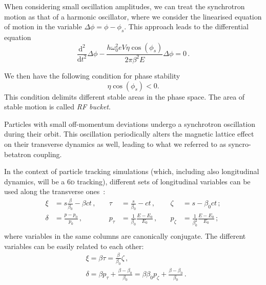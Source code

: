 When considering small oscillation amplitudes, we can treat the synchrotron motion as that of a harmonic oscillator, where we consider the linearised equation of motion in the variable $\Delta \phi=\phi-\phi_s$. This approach leads to the differential equation
\begin{equation}
    \frac{\mathrm{d}^2}{\mathrm{d} t^2} \Delta \phi-\frac{h \omega_0^2 e V \eta \cos \left(\phi_s\right)}{2 \pi \beta^2 E} \Delta \phi=0 \,.
\end{equation}

We then have the following condition for phase stability
\begin{equation}
    \eta \cos \left(\phi_s\right)<0 .
\end{equation}
This condition delimits different stable areas in the phase space. The area of stable motion is called \textit{RF bucket}. %

Particles with small off-momentum deviations undergo a synchrotron oscillation during their orbit. This oscillation periodically alters the magnetic lattice effect on their transverse dynamics as well, leading to what we referred to as syncro-betatron coupling.

In the context of particle tracking simulations (which, including also longitudinal dynamics, will be a 6\textsc{d} tracking), different sets of longitudinal variables can be used along the transverse ones~\cite{xsuite:physics}:
\begin{equation}
    \begin{aligned}
    \xi &= s \frac{\beta}{\beta_0}-\beta c t \,,\quad& \tau &= \frac{s}{\beta_0}-c t \,,\quad& \zeta &= s-\beta_0 c t \,;\\
    \delta &= \frac{p-p_0}{p_0} \,,\quad& p_\tau &= \frac{1}{\beta_0} \frac{E-E_0}{E_0} \,,\quad& p_\zeta &= \frac{1}{\beta_0^2} \frac{E-E_0}{E_0}\,; \\
    \end{aligned}
\end{equation}
where variables in the same columns are canonically conjugate.
The different variables can be easily related to each other:
\begin{equation}
    \begin{aligned}
    &\xi=\beta \tau=\frac{\beta}{\beta_0} \zeta \,,\\
    &\delta=\beta p_\tau+\frac{\beta-\beta_0}{\beta_0}=\beta \beta_0 p_\zeta+\frac{\beta-\beta_0}{\beta_0} \,.
    \end{aligned}
\end{equation}

